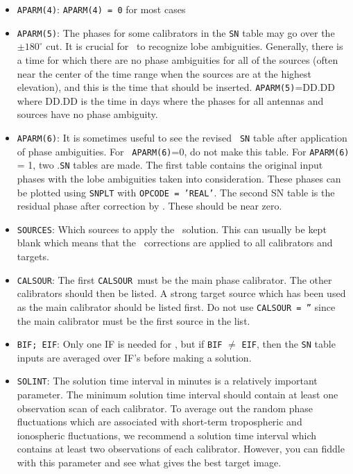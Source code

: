 {\begin {itemize}
\item {\tt APARM(4)}:  {\tt APARM(4) = 0} for most cases

\item {\tt APARM(5)}:  The phases for some calibrators in the {\tt SN} table
may go over the $\pm 180^\circ$ cut.  It is crucial for \ATMCA~to recognize
lobe ambiguities.  Generally, there is a time for which there are no
phase ambiguities for all of the sources (often near the center of the
time range when the sources are at the highest elevation), and this is the
time that should be inserted.  {\tt APARM(5)}=DD.DD where DD.DD is the
time in days where the phases for all antennas and sources have no
phase ambiguity.

\item {\tt APARM(6)}: It is sometimes useful to see the revised {\tt
SN} table after application of phase ambiguities.  For {\tt
APARM(6)}=0, do not make this table.  For {\tt APARM(6)} = 1, two
.{\tt SN} tables are made.  The first table contains the original
input phases with the lobe ambiguities taken into consideration.
These phases can be plotted using {\tt SNPLT} with {\tt OPCODE =
'REAL'}.  The second SN table is the residual phase after correction
by \ATMCA.  These should be near zero.

\item {\tt SOURCES}: Which sources to apply the \ATMCA~solution.  This
can usually be kept blank which means that the \ATMCA~corrections are
applied to all calibrators and targets.

\item {\tt CALSOUR}: The first {\tt CALSOUR}~must be the main phase
calibrator.  The other calibrators should then be listed.  A strong
target source which has been used as the main calibrator should be
listed first.  Do not use {\tt CALSOUR = ''} since the main calibrator
must be the first source in the list.

\item {\tt BIF; EIF}:  Only one IF is needed for \ATMCA,
but if {\tt BIF} $\neq$ {\tt EIF}, then the {\tt SN} table inputs are averaged
over IF's before making a solution.

\item {\tt SOLINT}: The solution time interval in minutes is a
relatively important parameter.  The minimum solution time interval
should contain at least one observation scan of each calibrator.  To
average out the random phase fluctuations which are associated with
short-term tropospheric and ionospheric fluctuations, we recommend a
solution time interval which contains at least two observations of
each calibrator.  However, you can fiddle with this parameter and see
what gives the best target image.


\end{itemize}}
